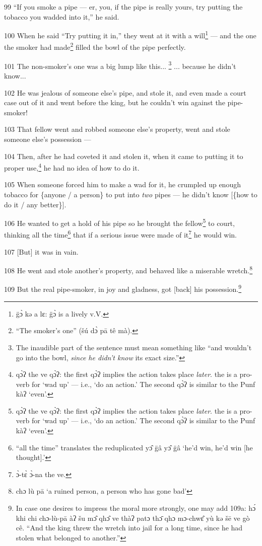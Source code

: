 99 ``If you smoke a pipe --- er, you, if the pipe is really yours, try putting
the tobacco you wadded into it,'' he said.

100 When he said ``Try putting it in,'' they went at it with a will\footnote{g̈ɔ̀ kə a lɛ: g̈ɔ̀ is a lively v.V.} --- and
the one the smoker had made\footnote{``The smoker's one'' (šú dɔ̀ pā tê mà).} filled the bowl of the pipe perfectly.

101 The non-smoker's one was a big lump like this... \footnote{The inaudible part of the sentence must mean something like ``and wouldn't go into the bowl, \textit{since he didn't know }its exact size.''} ... because he didn't
know...

102 He was jealous of someone else's pipe, and stole it, and even made a court
case out of it and went before the king, but he couldn't win against the pipe-smoker!

103 That fellow went and robbed someone else's property, went and stole someone
else's possession ---

104 Then, after he had coveted it and stolen it, when it came to putting it to
proper use,\footnote{qɔ̀ʔ the ve qɔ̀ʔ: the first qɔ̀ʔ implies the action takes place \textit{later}. the is a pro-verb for `wad up' --- i.e., `do an action.' The second qɔ̀ʔ is similar to the Punf kàʔ `even'.} he had no idea of how to do it.

105 When someone forced him to make a wad for it, he crumpled up enough tobacco
for \{anyone / a person\} to put into \textit{two }pipes --- he didn't know [\{how
to do it / any better\}].

106 He wanted to get a hold of his pipe so he brought the fellow\footnote{qɔ̀ʔ the ve qɔ̀ʔ: the first qɔ̀ʔ implies the action takes place \textit{later}. the is a pro-verb for `wad up' --- i.e., `do an action.' The second qɔ̀ʔ is similar to the Punf kàʔ `even'.} to court,
thinking all the time\footnote{``all the time'' translates the reduplicated yɔ̂ g̈â yɔ̂ g̈â `he'd win, he'd win [he thought].'} that if a serious issue were made of it\footnote{ɔ̀-tɛ̀ ɔ̀-na the ve.} he would
win.

107 [But] it was in vain.

108 He went and stole another's property, and behaved like a miserable wretch.\footnote{chɔ lù pā `a ruined person, a person who has gone bad'}

109 But the real pipe-smoker, in joy and gladness, got [back] his possession.\footnote{In case one desires to impress the moral more strongly, one may add 109a: hɔ́ khi chi chɔ-lù-pā àʔ šu mɔ̂ qhɔ̂ ve thàʔ patɔ thɔ̄ qhɔ mɔ-chwɛ̂ yù kə šē ve gò cê. ``And the king threw the wretch into jail for a long time, since he had stolen what belonged to another.''}

